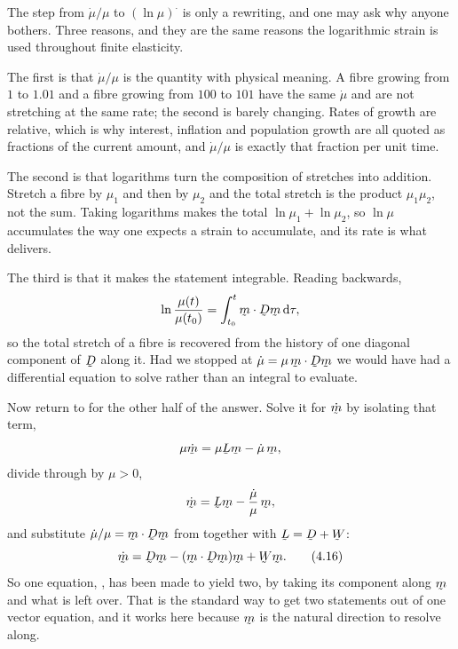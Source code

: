 \begin{remark}\label{rem:whylog}
The step from $\dot\mu/\mu$ to $(\ln\mu)^{\textstyle\cdot}$ is only a
rewriting, and one may ask why anyone bothers. Three reasons, and they are
the same reasons the logarithmic strain is used throughout finite
elasticity.

The first is that $\dot\mu/\mu$ is the quantity with physical meaning. A
fibre growing from $1$ to $1.01$ and a fibre growing from $100$ to $101$
have the same $\dot\mu$ and are not stretching at the same rate; the
second is barely changing. Rates of growth are relative, which is why
interest, inflation and population growth are all quoted as fractions of
the current amount, and $\dot\mu/\mu$ is exactly that fraction per unit
time.

The second is that logarithms turn the composition of stretches into
addition. Stretch a fibre by $\mu_{1}$ and then by $\mu_{2}$ and the total
stretch is the product $\mu_{1}\mu_{2}$, not the sum. Taking logarithms
makes the total $\ln\mu_{1}+\ln\mu_{2}$, so $\ln\mu$ accumulates the way
one expects a strain to accumulate, and its rate is what 
delivers.

The third is that it makes the statement integrable. Reading 
backwards,
\[
   \ln\frac{\mu(t)}{\mu(t_{0})}
   =\int_{t_{0}}^{t}\ip\bm{\bD\bm}\,\dl\tau ,
\]
so the total stretch of a fibre is recovered from the history of one
diagonal component of $\bD$ along it. Had we stopped at $\dot\mu=\mu\,
\ip\bm{\bD\bm}$ we would have had a differential equation to solve rather
than an integral to evaluate.
\end{remark}

Now return to  for the other half of the answer. Solve it for
$\dot\bm$ by isolating that term,
\[
   \mu\dot\bm=\mu\bL\bm-\dot\mu\,\bm ,
\]
divide through by $\mu>0$,
\[
   \dot\bm=\bL\bm-\frac{\dot\mu}{\mu}\,\bm ,
\]
and substitute $\dot\mu/\mu=\ip\bm{\bD\bm}$ from  together with
$\bL=\bD+\bW$:
\begin{equation}
   \dot\bm=\bD\bm-(\ip\bm{\bD\bm})\bm+\bW\bm .
   \tag{4.16}\label{eq:4.16}
\end{equation}
So one equation, , has been made to yield two, by taking its
component along $\bm$ and what is left over. That is the standard way to
get two statements out of one vector equation, and it works here because
$\bm$ is the natural direction to resolve along.

